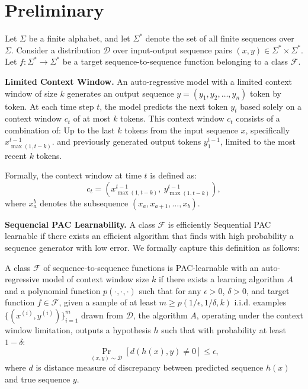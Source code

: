 
\section{Preliminary}
\label{section3}
Let \( \Sigma \) be a finite alphabet, and let \( \Sigma^* \) denote the set of all finite sequences over \( \Sigma \). Consider a distribution \( \mathcal{D} \) over input-output sequence pairs \( (x, y) \in \Sigma^* \times \Sigma^* \). Let \( f: \Sigma^* \rightarrow \Sigma^* \) be a target sequence-to-sequence function belonging to a class \( \mathcal{F} \).

\textbf{Limited Context Window.} An auto-regressive model with a limited context window of size \( k \) generates an output sequence \( y = (y_1, y_2, \dots, y_n) \) token by token. At each time step \( t \), the model predicts the next token \( y_t \) based solely on a context window \( c_t \) of at most \( k \) tokens. This context window \( c_t \) consists of a combination of:
Up to the last \( k \) tokens from the input sequence \( x \), specifically \( x_{\max(1, t - k)}^{t - 1} \).
and previously generated output tokens \( y_1^{t - 1} \), limited to the most recent \( k \) tokens.

Formally, the context window at time \( t \) is defined as:
\[
c_t = \left( x_{\max(1, t - k)}^{t - 1}, \ y_{\max(1, t - k)}^{t - 1} \right),
\]
where \( x_a^b \) denotes the subsequence \( (x_a, x_{a+1}, \dots, x_b) \).

\textbf{Sequencial PAC Learnability.} A class \(\mathcal{F}\) is efficiently Sequential PAC learnable if there exists an efficient algorithm that finds with high probability a sequence generator with low error. We formally capture this definition as follows:
\begin{definition}
    A class \( \mathcal{F} \) of sequence-to-sequence functions is PAC-learnable with an auto-regressive model of context window size \( k \) if there exists a learning algorithm \( A \) and a polynomial function \( p(\cdot, \cdot, \cdot) \) such that for any \( \epsilon > 0 \), \( \delta > 0 \), and target function \( f \in \mathcal{F} \),
given a sample of at least \( m \geq p(1/\epsilon, 1/\delta, k) \) i.i.d. examples \( \{ (x^{(i)}, y^{(i)}) \}_{i=1}^m \) drawn from \( \mathcal{D} \), the algorithm \( A \), operating under the context window limitation, outputs a hypothesis \( h \) such that with probability at least \( 1 - \delta \):
\[
\Pr_{(x, y) \sim \mathcal{D}} \left[ d(h(x), y) \neq 0 \right] \leq \epsilon,
\]
where \( d \) is distance measure of discrepancy between predicted sequence \( h(x) \) and true sequence \( y \).
\end{definition}



